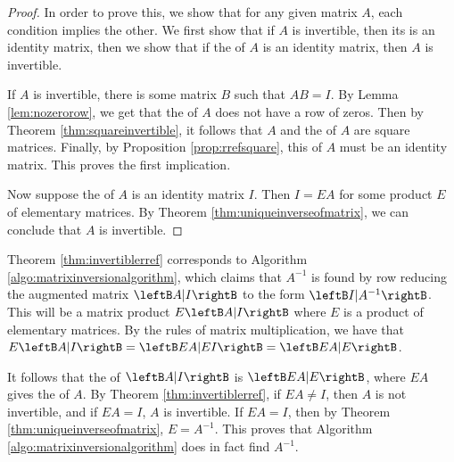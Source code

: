\begin{proof}
In order to prove this, we show that for any given matrix $A$, each condition implies the other. We first show that if $A$ is invertible, then its \rref \;is an identity matrix, then we show that if the \rref \;of $A$ is an identity matrix, then $A$ is invertible. 

If $A$ is invertible, there is some matrix $B$ such that $AB = I$. By Lemma \ref{lem:nozerorow}, we get that the \rref \;of $A$ does not have a row of zeros. Then by Theorem \ref{thm:squareinvertible}, it follows that $A$ and the \rref \;of $A$ are square matrices. Finally, by Proposition \ref{prop:rrefsquare}, this \rref \;of $A$ must be an identity matrix. This proves the first implication.

Now suppose the \rref \;of $A$ is an identity matrix $I$. Then $I=EA$ for some product $E$ of elementary matrices. By Theorem \ref{thm:uniqueinverseofmatrix}, we can conclude that $A$ is invertible.
\end{proof}

Theorem \ref{thm:invertiblerref} corresponds to Algorithm \ref{algo:matrixinversionalgorithm}, which claims that $A^{-1}$ is found by row reducing the augmented matrix $\leftB A|I\rightB$ to the form $\leftB I|A^{-1}\rightB$. This will be a matrix product $E\leftB A|I\rightB$ where $E$ is a product of elementary matrices. By the rules of matrix multiplication, we have that $E\leftB A|I\rightB = \leftB EA|EI\rightB = \leftB EA|E\rightB$.

It follows that the \rref \;of $\leftB A|I\rightB$ is $\leftB EA|E\rightB$, where $EA$ gives the \rref \;of $A$. By Theorem \ref{thm:invertiblerref}, if $EA \neq I$, then $A$ is not invertible, and if $EA=I$, $A$ is invertible. If $EA=I$, then by Theorem \ref{thm:uniqueinverseofmatrix}, $E=A^{-1}$. This proves that Algorithm \ref{algo:matrixinversionalgorithm} does in fact find $A^{-1}$.